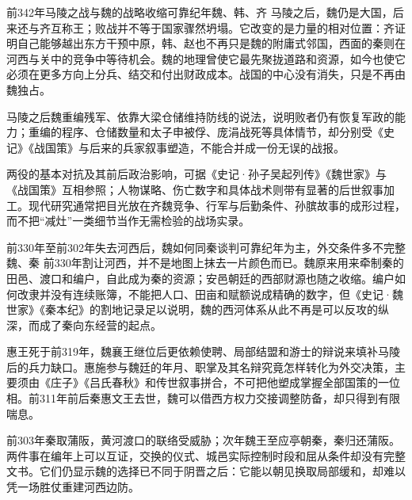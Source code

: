 \begin{event}{前342年}{马陵之战与魏的战略收缩}{可靠纪年}{魏、韩、齐}
马陵之后，魏仍是大国，后来还与齐互称王；败战并不等于国家骤然坍塌。它改变的是力量的相对位置：齐证明自己能够越出东方干预中原，韩、赵也不再只是魏的附庸式邻国，西面的秦则在河西与关中的竞争中等待机会。魏的地理曾使它最先聚拢道路和资源，如今也使它必须在更多方向上分兵、结交和付出财政成本。战国的中心没有消失，只是不再由魏独占。

马陵之后魏重编残军、依靠大梁仓储维持防线的说法，说明败者仍有恢复军政的能力；重编的程序、仓储数量和太子申被俘、庞涓战死等具体情节，却分别受《史记》《战国策》与后来的兵家叙事塑造，不能合并成一份无误的战报。
\end{event}

\begin{sourcenote}[桂陵、马陵与魏国衰势]
两役的基本对抗及其前后政治影响，可据《史记·孙子吴起列传》《魏世家》与《战国策》互相参照；人物谋略、伤亡数字和具体战术则带有显著的后世叙事加工。现代研究通常把目光放在齐魏竞争、行军与后勤条件、孙膑故事的成形过程，而不把“减灶”一类细节当作无需检验的战场实录。
\end{sourcenote}

\begin{event}{前330年至前302年}{失去河西后，魏如何同秦谈判}{可靠纪年为主，外交条件多不完整}{魏、秦}
前330年割让河西，并不是地图上抹去一片颜色而已。魏原来用来牵制秦的田邑、渡口和编户，自此成为秦的资源；安邑朝廷的西部财源也随之收缩。编户如何改隶并没有连续账簿，不能把人口、田亩和赋额说成精确的数字，但《史记·魏世家》《秦本纪》的割地记录足以说明，魏的西河体系从此不再是可以反攻的纵深，而成了秦向东经营的起点。

惠王死于前319年，魏襄王继位后更依赖使聘、局部结盟和游士的辩说来填补马陵后的兵力缺口。惠施参与魏廷的年月、职掌及其名辩究竟怎样转化为外交决策，主要须由《庄子》《吕氏春秋》和传世叙事拼合，不可把他塑成掌握全部国策的一位相。前311年前后秦惠文王去世，魏可以借西方权力交接调整防备，却只得到有限喘息。

前303年秦取蒲阪，黄河渡口的联络受威胁；次年魏王至应亭朝秦，秦归还蒲阪。两件事在编年上可以互证，交换的仪式、城邑实际控制时段和屈从条件却没有完整文书。它们仍显示魏的选择已不同于阴晋之后：它能以朝见换取局部缓和，却难以凭一场胜仗重建河西边防。
\end{event}


